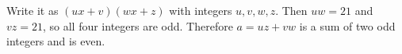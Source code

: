 Write it as $(ux+v)(wx+z)$ with integers $u,v,w,z$. Then $uw=21$ and $vz=21$, so all four integers are odd. Therefore $a=uz+vw$ is a sum of two odd integers and is even.
